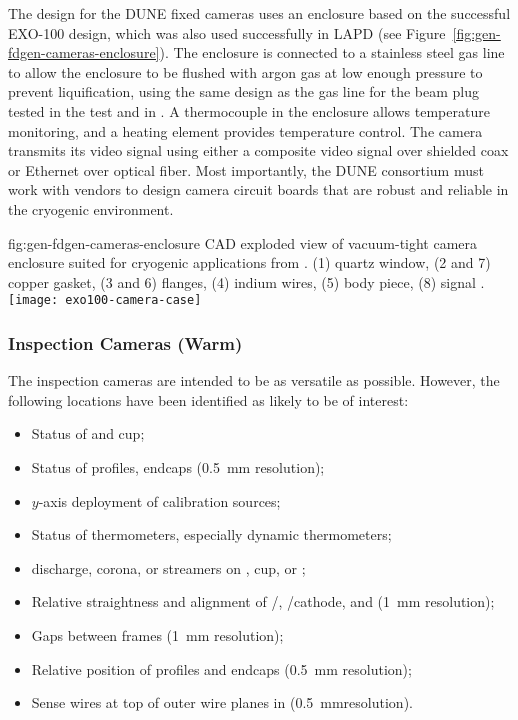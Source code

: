 The design for the DUNE fixed cameras uses an enclosure based on
the successful EXO-100 design\cite{Delaquis:2013hva}, which was also
used successfully in
LAPD (see Figure~\ref{fig:gen-fdgen-cameras-enclosure}). The enclosure is
 connected to a stainless steel gas line to allow the enclosure to be
flushed with argon gas at low enough pressure to prevent
liquification, using the same design as the gas line for the beam plug
tested in the   test and in .  A thermocouple in the
enclosure allows temperature monitoring, and a heating element
provides temperature control.  The camera transmits its video
signal using either a composite video signal over shielded coax or
Ethernet over optical fiber.  Most importantly, the DUNE 
consortium must work with vendors to design camera circuit boards that
are robust and reliable in the cryogenic environment.

\begin{dunefigure}{fig:gen-fdgen-cameras-enclosure}
  {CAD exploded view of vacuum-tight camera enclosure suited for cryogenic applications from \cite{Delaquis:2013hva}.
    (1) quartz window, (2 and 7) copper gasket, (3 and 6) flanges, (4) indium wires, (5) body piece, (8) signal \fdth.
  }
  \texttt{[image: exo100-camera-case]}%
\end{dunefigure}



\subsubsection{Inspection Cameras (Warm)}

The inspection cameras are intended to be as versatile as possible.
However, the following locations have been identified as likely
to be of interest:
\begin{itemize}
\item Status of  \fdth and cup;
\item Status of  profiles, endcaps (\SI{0.5}{mm} resolution);
\item $y$-axis deployment of calibration sources;
\item Status of thermometers, especially dynamic thermometers;
\item {} discharge, corona, or streamers on  \fdth, cup, or ;
\item Relative straightness and alignment of /, /cathode, and  (\SI{1}{mm} resolution);
\item Gaps between  frames (\SI{1}{mm} resolution);
\item Relative position of profiles and endcaps (\SI{0.5}{mm} resolution);
\item Sense wires at top of outer wire planes in \single {} (\SI{0.5}{mm}resolution).
\end{itemize}

